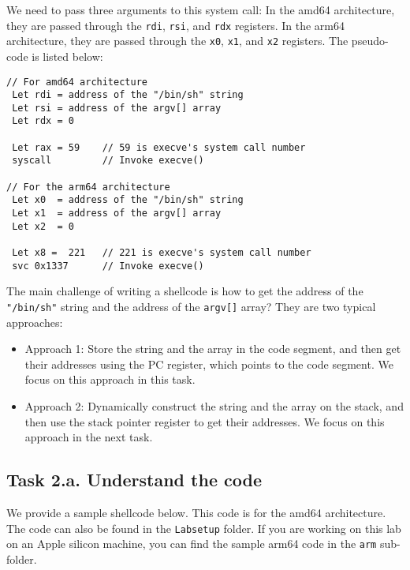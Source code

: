 We need to pass three arguments to this system call:
In the amd64 architecture, they are
passed through the \texttt{rdi}, \texttt{rsi},
and \texttt{rdx} registers.  
In the arm64 architecture, they are
passed through the \texttt{x0}, \texttt{x1}, 
and \texttt{x2} registers. 
The pseudo-code is listed below: 

\begin{lstlisting}
// For amd64 architecture
 Let rdi = address of the "/bin/sh" string
 Let rsi = address of the argv[] array
 Let rdx = 0

 Let rax = 59    // 59 is execve's system call number
 syscall         // Invoke execve()

// For the arm64 architecture
 Let x0  = address of the "/bin/sh" string
 Let x1  = address of the argv[] array
 Let x2  = 0

 Let x8 =  221   // 221 is execve's system call number
 svc 0x1337      // Invoke execve()
\end{lstlisting}


The main challenge of writing a shellcode is how to get the address 
of the \texttt{"/bin/sh"} string and the address of 
the \texttt{argv[]} array? They are two typical approaches:


\begin{itemize}
\item Approach 1: Store the string and the array in the code segment, 
  and then get their addresses using the PC register, which points to the
  code segment. We focus on this approach in this task. 

\item Approach 2: Dynamically construct the string and the 
  array on the stack, and then use the stack pointer register 
  to get their addresses. We focus on this approach in the next task.
\end{itemize}
 

\subsection{Task 2.a. Understand the code} 

We provide a sample shellcode below. This code is for the amd64 
architecture. The code can also be found in the \texttt{Labsetup} folder. 
If you are working on this lab on an Apple silicon machine, you can
find the sample arm64 code in the \texttt{arm} sub-folder.

